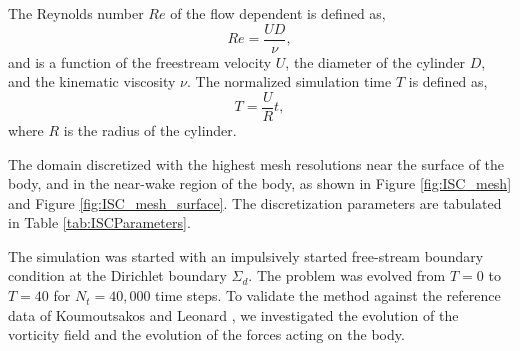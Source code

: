 The Reynolds number $Re$ of the flow dependent is defined as,
	\begin{equation}
	Re = \frac{UD}{\nu},
	\end{equation}
and is a function of the freestream velocity $U$, the diameter of the cylinder $D$, and the kinematic viscosity $\nu$. The normalized simulation time $T$ is defined as,
	\begin{equation}
	T = \frac{U}{R}t,
	\end{equation}	
where $R$ is the radius of the cylinder. 

The domain discretized with the highest mesh resolutions near the surface of the body, and in the near-wake region of the body, as shown in Figure \ref{fig:ISC_mesh} and Figure \ref{fig:ISC_mesh_surface}. The discretization parameters are tabulated in Table \ref{tab:ISCParameters}.

The simulation was started with an impulsively started free-stream boundary condition at the Dirichlet boundary $\Sigma_{d}$. The problem was evolved from $T=0$ to $T=40$ for $N_{t}=40,000$ time steps. To validate the method against the reference data of Koumoutsakos and Leonard \cite{Koumoutsakos1995a}, we investigated the evolution of the vorticity field and the evolution of the forces acting on the body.


